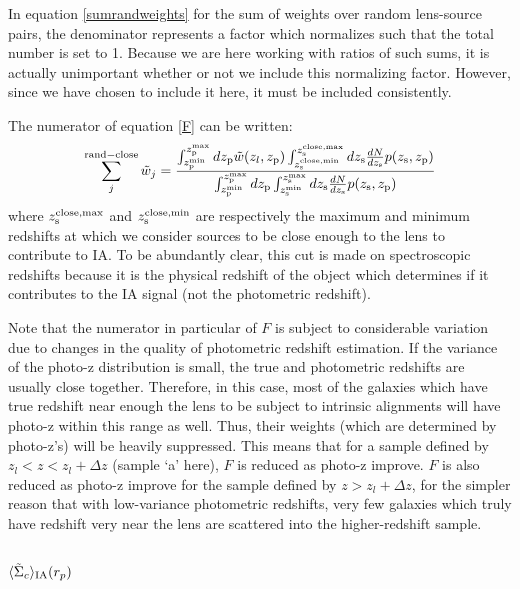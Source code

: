 \documentclass[onecolumn,amsmath,aps,fleqn, superscriptaddress]{revtex4}
\begin{document}
In equation \ref{sumrandweights} for the sum of weights over random lens-source pairs, the denominator represents a factor which normalizes such that the total number is set to 1. Because we are here working with ratios of such sums, it is actually unimportant whether or not we include this normalizing factor. However, since we have chosen to include it here, it must be included consistently.

The numerator of equation \ref{F} can be written:
\begin{equation}
\sum\limits_{j}^{\rm rand-close}\tilde{w}_j = \frac{\int_{z_{\rm p}^{\rm min}}^{z_{\rm p}^{\rm max}} d z_{\rm p} \tilde{w}(z_l, z_{\rm p}) \int_{z_{\rm s}^{\rm close, min}}^{z_{\rm s}^{\rm close, max}} dz_{\rm s} \frac{dN}{dz_{\rm s}} p(z_{\rm s}, z_{\rm p})}{\int_{z_{\rm p}^{\rm min}}^{z_{\rm p}^{\rm max}} d z_{\rm p} \int_{z_{\rm s}^{\rm min}}^{z_{\rm s}^{\rm max}} dz_{\rm s} \frac{dN}{dz_{\rm s}} p(z_{\rm s}, z_{\rm p})}
\label{sumrandcloseweights}
\end{equation}
where $z_{\rm s}^{\rm close,max}$ and $z_{\rm s}^{\rm close,min}$ are respectively the maximum and minimum redshifts at which we consider sources to be close enough to the lens to contribute to IA. To be abundantly clear, this cut is made on spectroscopic redshifts because it is the physical redshift of the object which determines if it contributes to the IA signal (not the photometric redshift). 

Note that the numerator in particular of $F$ is subject to considerable variation due to changes in the quality of photometric redshift estimation. If the variance of the photo-z distribution is small, the true and photometric redshifts are usually close together. Therefore, in this case, most of the galaxies which have true redshift near enough the lens to be subject to intrinsic alignments will have photo-z within this range as well. Thus, their weights (which are determined by photo-z's) will be heavily suppressed. This means that for a sample defined by $z_l<z<z_l+\Delta z$ (sample `a' here), $F$ is reduced as photo-z improve. $F$ is also reduced as photo-z improve for the sample defined by $z>z_l+\Delta z$, for the simpler reason that with low-variance photometric redshifts, very few galaxies which truly have redshift very near the lens are scattered into the higher-redshift sample.

\subsection{$\langle \tilde{\Sigma}_c\rangle_{\rm IA}(r_p)$}
\end{document}
